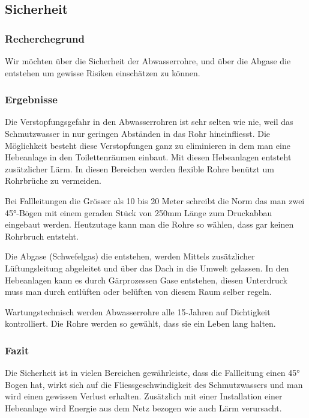 \subsection{Sicherheit}


\subsubsection{Recherchegrund}
Wir möchten über die Sicherheit der Abwasserrohre, und über die Abgase die entstehen um gewisse Risiken einschätzen zu können. 

\subsubsection{Ergebnisse}

Die Verstopfungsgefahr in den Abwasserrohren ist sehr selten wie nie, weil das Schmutzwasser in nur geringen Abständen in das Rohr hineinfliesst. Die Möglichkeit besteht diese Verstopfungen ganz zu eliminieren in dem man eine Hebeanlage in den Toilettenräumen einbaut. Mit diesen Hebeanlagen entsteht zusätzlicher Lärm. In diesen Bereichen werden flexible Rohre benützt um Rohrbrüche zu vermeiden.

Bei Fallleitungen die Grösser als 10 bis 20 Meter schreibt die Norm das man zwei 45°-Bögen mit einem geraden Stück von 250mm Länge zum Druckabbau eingebaut werden. Heutzutage kann man die Rohre so wählen, dass gar keinen Rohrbruch entsteht.

Die Abgase (Schwefelgas) die entstehen, werden Mittels zusätzlicher Lüftungsleitung abgeleitet und über das Dach in die Umwelt gelassen. In den Hebeanlagen kann es durch Gärprozessen Gase entstehen, diesen Unterdruck muss man durch entlüften oder belüften von diesem Raum selber regeln. 

Wartungstechnisch werden Abwasserrohre alle 15-Jahren auf Dichtigkeit kontrolliert. Die Rohre werden so gewählt, dass sie ein Leben lang halten.

\subsubsection{Fazit}
Die Sicherheit ist in vielen Bereichen gewährleiste, dass die Fallleitung einen 45° Bogen hat, wirkt sich auf die Fliessgeschwindigkeit des Schmutzwassers und man wird einen gewissen Verlust erhalten. Zusätzlich mit einer Installation einer Hebeanlage wird Energie aus dem Netz bezogen wie auch Lärm verursacht.

\clearpage 





